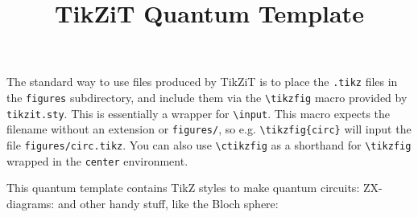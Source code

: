 \documentclass{article}
\title{TikZiT Quantum Template}
\begin{document}
\maketitle

The standard way to use files produced by TikZiT is to place the \texttt{.tikz} files in the \texttt{figures} subdirectory, and include them via the \texttt{\textbackslash{}tikzfig} macro provided by \texttt{tikzit.sty}. This is essentially a wrapper for \texttt{\textbackslash{}input}. This macro expects the filename without an extension or \texttt{figures/}, so e.g. \texttt{\textbackslash{}tikzfig\{circ\}} will input the file \texttt{figures/circ.tikz}. You can also use \texttt{\textbackslash{}ctikzfig} as a shorthand for \texttt{\textbackslash{}tikzfig} wrapped in the \texttt{center} environment.

This quantum template contains TikZ styles to make quantum circuits:
ZX-diagrams:
and other handy stuff, like the Bloch sphere:
\end{document}
